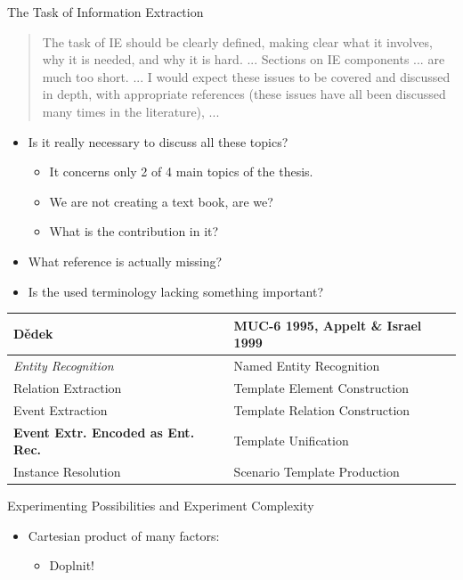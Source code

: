 \documentclass[xcolor=dvipsnames]{beamer}
\begin{document}
\begin{frame}{The Task of Information Extraction}
\begin{quotation}
\small The task of IE should be clearly defined, making clear what it involves, why it is needed, and why it is hard. ... Sections on IE components ... are much too short. ... I would expect these issues to be covered and discussed in depth, with appropriate references (these issues have all been discussed many times in the literature), ...
\end{quotation}

\begin{itemize}
	\item Is it really necessary to discuss all these topics?	
	\begin{itemize}
		\item It concerns only 2 of 4 main topics of the thesis.
		\item We are not creating a text book, are we?
		\item What is the contribution in it?
	\end{itemize}	
	\item What reference is actually missing?
	\item Is the used terminology lacking something important?
\end{itemize}
\begin{center}
	\begin{tabular}{l|l}
		Dědek & MUC-6 1995, Appelt \& Israel 1999\\
		\hline
		\emph{Entity Recognition} & Named Entity Recognition\\
		Relation Extraction & Template Element Construction\\
		Event Extraction & Template Relation Construction	\\
		\textbf{Event Extr. Encoded as Ent. Rec.} & Template Unification\\
		Instance Resolution & Scenario Template Production
	\end{tabular}
\end{center}
\end{frame}




\begin{frame}{Experimenting Possibilities and Experiment Complexity}
\label{future_experiments}
\begin{itemize}
	\item Cartesian product of many factors:
	\begin{itemize}
		\item Doplnit!
	\end{itemize}
\end{itemize}
\end{frame}
\resetcolor
\end{document}
